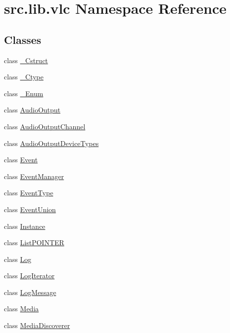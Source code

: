 \hypertarget{namespacesrc_1_1lib_1_1vlc}{}\section{src.\+lib.\+vlc Namespace Reference}
\label{namespacesrc_1_1lib_1_1vlc}
\subsection*{Classes}
\begin{DoxyCompactItemize}
\item 
class \hyperlink{classsrc_1_1lib_1_1vlc_1_1__Cstruct}{\+\_\+\+Cstruct}
\item 
class \hyperlink{classsrc_1_1lib_1_1vlc_1_1__Ctype}{\+\_\+\+Ctype}
\item 
class \hyperlink{classsrc_1_1lib_1_1vlc_1_1__Enum}{\+\_\+\+Enum}
\item 
class \hyperlink{classsrc_1_1lib_1_1vlc_1_1AudioOutput}{Audio\+Output}
\item 
class \hyperlink{classsrc_1_1lib_1_1vlc_1_1AudioOutputChannel}{Audio\+Output\+Channel}
\item 
class \hyperlink{classsrc_1_1lib_1_1vlc_1_1AudioOutputDeviceTypes}{Audio\+Output\+Device\+Types}
\item 
class \hyperlink{classsrc_1_1lib_1_1vlc_1_1Event}{Event}
\item 
class \hyperlink{classsrc_1_1lib_1_1vlc_1_1EventManager}{Event\+Manager}
\item 
class \hyperlink{classsrc_1_1lib_1_1vlc_1_1EventType}{Event\+Type}
\item 
class \hyperlink{classsrc_1_1lib_1_1vlc_1_1EventUnion}{Event\+Union}
\item 
class \hyperlink{classsrc_1_1lib_1_1vlc_1_1Instance}{Instance}
\item 
class \hyperlink{classsrc_1_1lib_1_1vlc_1_1ListPOINTER}{List\+P\+O\+I\+N\+T\+E\+R}
\item 
class \hyperlink{classsrc_1_1lib_1_1vlc_1_1Log}{Log}
\item 
class \hyperlink{classsrc_1_1lib_1_1vlc_1_1LogIterator}{Log\+Iterator}
\item 
class \hyperlink{classsrc_1_1lib_1_1vlc_1_1LogMessage}{Log\+Message}
\item 
class \hyperlink{classsrc_1_1lib_1_1vlc_1_1Media}{Media}
\item 
class \hyperlink{classsrc_1_1lib_1_1vlc_1_1MediaDiscoverer}{Media\+Discoverer}
\item 

\end{DoxyCompactItemize}
